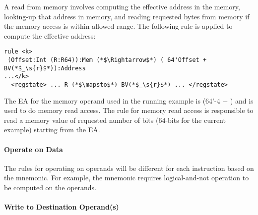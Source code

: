 A read from memory involves computing the effective address in the memory, looking-up that address in memory, and reading requested bytes from memory if the memory access is within allowed range.
The following rule is applied to compute the effective address:
\begin{lstlisting}[style=KRULE]
rule <k> 
 (Offset:Int (R:R64)):Mem (*$\Rightarrow$*) ( 64'Offset + BV(*$_\s{r}$*)):Address
...</k>
  <regstate> ... R (*$\mapsto$*) BV(*$_\s{r}$*) ... </regstate>
\end{lstlisting}
 The EA for the memory operand used in the running example is (64'-4 + ) and is used to do memory read access. The rule for memory read access is responsible to read a memory value of requested number of bits ($64$-bits for the current example) starting from the EA. 
 
\vspace{-2pt}
\paragraph{Operate on Data}

The rules for operating on operands will be different for each instruction based on the mnemonic. For example, the mnemonic  requires logical-and-not operation to be computed on the operands.

\vspace{-2pt}
\paragraph{Write to Destination Operand(s)}


